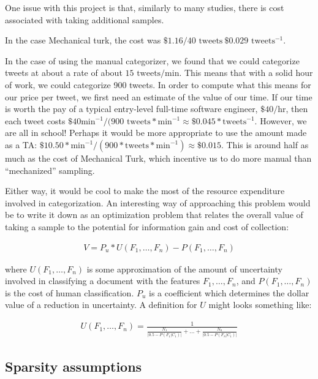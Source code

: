 \documentclass[12pt,a4paper]{article}
\begin{document}
One issue with this project is that, similarly to many studies, there is cost associated with taking additional samples.

In the case Mechanical turk, the cost was $ \$1.16 / 40 \text{ tweets} ~ \$0.029 \text{ tweets}^{-1}$. 


In the case of using the manual categorizer, we found that we could categorize tweets at about a rate of about $ 15 \text{ tweets} / \text{min} $.  This means that with a solid hour of work, we could categorize 900 tweets.  In order to compute what this means for our price per tweet, we first need an estimate of the value of our time.  If our time is worth the pay of a typical entry-level full-time software engineer, $ \$40 / \text{hr} $, then each tweet costs $ \$40 \text{min}^{-1} / ( 900 \text{ tweets} * \text{min}^{-1} \approx \$0.045 * \text{tweets}^{-1} $.  However, we are all in school!  Perhaps it would be more appropriate to use the amount made as a TA: $ \$10.50 * \text{min}^{-1} / ( 900 * \text{tweets} * \text{min}^{-1} ) \approx \$0.015 $.  This is around half as much as the cost of Mechanical Turk, which incentive us to do more manual than ``mechanized'' sampling.

Either way, it would be cool to make the most of the resource expenditure involved in categorization.  An interesting way of approaching this problem would be to write it down as an optimization problem that relates the overall value of taking a sample to the potential for information gain and cost of collection:

\begin{align*}
V = P_u * U(F_1,\dots,F_n) - P(F_1,\dots,F_n)
\end{align*}

where $ U(F_1,\dots,F_n) $ is some approximation of the amount of uncertainty involved in classifying a document with the features $ F_1,\dots,F_n $, and $ P(F_1,\dots,F_n) $ is the cost of human classification.  $ P_u $ is a coefficient which determines the dollar value of a reduction in uncertainty.  A definition for $ U $ might looks something like:

\begin{align*}
U(F_1,\dots,F_n) = \frac {1} {\frac{N_1}{\vert 0.5 - P(F_1 \vert C_1) \vert} + \dots + \frac{N_n}{\vert 0.5 - P(F_n \vert C_1) \vert}}
\end{align*}

\subsection { Sparsity assumptions }
\end{document}
